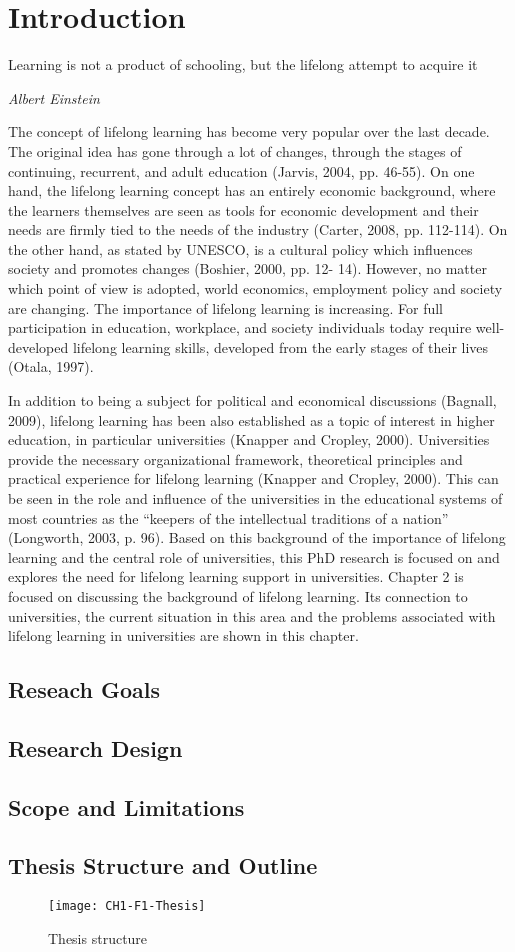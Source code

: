\chapter{Introduction\label{cha:intro}}
\epigraph{Learning is not a product of schooling, but the lifelong attempt to
acquire it}{\textit{Albert Einstein}}
\noindent
The concept of lifelong learning has become very popular over the last decade.
The original idea has gone through a lot of changes, through the stages of
continuing, recurrent, and adult education (Jarvis, 2004, pp. 46-55). On one
hand, the lifelong learning concept has an entirely economic background, where
the learners themselves are seen as tools for economic development and their
needs are firmly tied to the needs of the industry (Carter, 2008, pp. 112-114).
On the other hand, as stated by UNESCO, \LLLs is a
cultural policy which influences society and promotes changes (Boshier, 2000, pp. 12-
14). However, no matter which point of view is adopted, world economics, employment
policy and society are changing. The importance of lifelong learning is increasing. For
full participation in education, workplace, and society individuals today require well-
developed lifelong learning skills, developed from the early stages of their lives (Otala,
1997).

In addition to being a subject for political and economical discussions (Bagnall, 2009),
lifelong learning has been also established as a topic of interest in higher education, in
particular universities (Knapper and Cropley, 2000). Universities provide the
necessary organizational framework, theoretical principles and practical experience for lifelong
learning (Knapper and Cropley, 2000). This can be seen in the role and influence
of the universities in the educational systems of most countries as the “keepers of the
intellectual traditions of a nation” (Longworth, 2003, p. 96). Based on this background of
the importance of lifelong learning and the central role of universities, this PhD research
is focused on and explores the need for lifelong learning support in
universities. Chapter 2 is focused on discussing the background of lifelong
learning. Its connection to universities, the current situation in this area and
the problems associated with lifelong learning in universities are shown in this chapter.


\section{Reseach Goals}

\section{Research Design}

\section{Scope and Limitations}

\section{Thesis Structure and Outline}

\begin{figure}[htb]
\centering
\texttt{[image: CH1-F1-Thesis]}
\caption{Thesis structure}
\label{fig:ts}
\end{figure}

